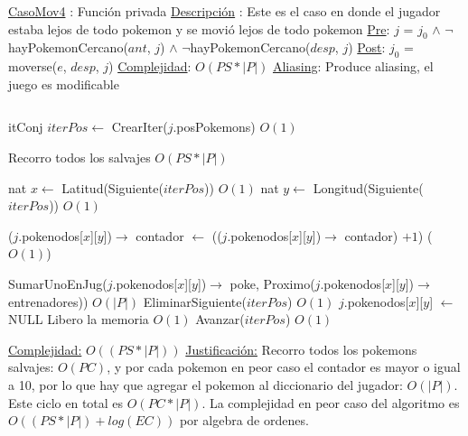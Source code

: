 \begin{Algoritmos}
\begin{algorithmic}[1]
\Statex \underline{CasoMov4} : Funci\'on privada 
\Statex \underline{Descripci\'on} : Este es el caso en donde el jugador estaba lejos de todo pokemon y se movi\'o lejos de todo pokemon
\Statex \underline{Pre}: $j$ = $j_0$ $\land$ $\neg$hayPokemonCercano($ant$, $j$) $\land$ $\neg$hayPokemonCercano($desp$, $j$) 
\Statex \underline{Post}: $j_0$ = moverse($e$, $desp$, $j$) 
\Statex \underline{Complejidad}: $O(PS *|P|)$ 
\Statex \underline{Aliasing}: Produce aliasing, el juego es modificable

$ $\newline


\State itConj $iterPos \gets$ CrearIter($j$.posPokemons) \Comment $O(1)$ 

 Recorro todos los salvajes \Comment $O(PS * |P|)$

	\State nat $x \gets$ Latitud(Siguiente($iterPos$)) \Comment $O(1)$
	\State nat $y \gets$ Longitud(Siguiente($iterPos$)) \Comment $O(1)$		
	
	\State ($j$.pokenodos[$x$][$y$])$\rightarrow$ contador $\gets$ (($j$.pokenodos[$x$][$y$])$\rightarrow$ contador) $+ 1$) \Comment($O(1)$)
	
		\State SumarUnoEnJug($j$.pokenodos[$x$][$y$])$\rightarrow$ poke, Proximo($j$.pokenodos[$x$][$y$])$\rightarrow$ entrenadores)) \Comment $O(|P|)$
		\State EliminarSiguiente($iterPos$) \Comment $O(1)$
		\State $j$.pokenodos[$x$][$y$] $\gets$ NULL \Comment Libero la memoria $O(1)$
	\Else 
		\State Avanzar($iterPos$)	\Comment $O(1)$	
	\EndIf

\EndWhile 



\medskip
\Statex \underline{Complejidad:} $O((PS *|P|))$ 
\Statex \underline{Justificaci\'on:} Recorro todos los pokemons salvajes: $O(PC)$, y por cada pokemon en peor caso el contador es mayor o igual a 10, por lo que hay que agregar el pokemon al diccionario del jugador: $O(|P|)$. Este ciclo en total es $O(PC*|P|)$. La complejidad en peor caso del algoritmo es $O((PS *|P|) + log(EC))$ por algebra de ordenes.
\end{algorithmic}

$ $\newline
$ $\newline





\end{Algoritmos}
